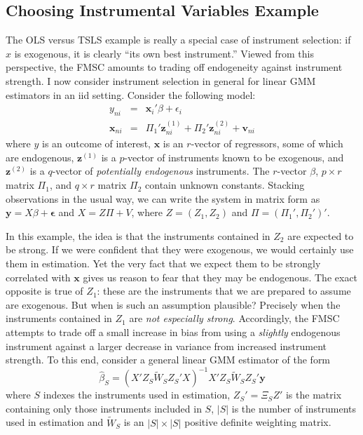 \subsection{Choosing Instrumental Variables Example}
\label{sec:chooseIVexample}
The OLS versus TSLS example is really a special case of instrument selection: if $x$ is exogenous, it is clearly ``its own best instrument.'' 
Viewed from this perspective, the FMSC amounts to trading off endogeneity against instrument strength. I now consider instrument selection in general for linear GMM estimators in an iid setting. 
Consider the following model:
\begin{eqnarray}
    y_{ni} &=& \mathbf{x}_i' \beta +  \epsilon_i\\
    \mathbf{x}_{ni} &=&  \Pi_1' \mathbf{z}_{ni}^{(1)} + \Pi_2'\mathbf{z}_{ni}^{(2)} + \mathbf{v}_{ni}
\end{eqnarray}
where $y$ is an outcome of interest, $\mathbf{x}$ is an $r$-vector of regressors, some of which are endogenous, $\mathbf{z}^{(1)}$ is a $p$-vector of instruments known to be exogenous, and $\mathbf{z}^{(2)}$ is a $q$-vector  of \emph{potentially endogenous} instruments. 
The $r$-vector $\beta$, $p\times r$ matrix $\Pi_1$, and $q\times r$ matrix $\Pi_2$ contain unknown constants. Stacking observations in the usual way, we can write the system in matrix form as $\mathbf{y} = X\beta +\boldsymbol{\epsilon}$ and $X =  Z \Pi + V$, where $Z = (Z_1, Z_2)$ and $\Pi = (\Pi_1', \Pi_2')'$. 

In this example, the idea is that the instruments contained in $Z_2$ are expected to be strong.
If we were confident that they were exogenous, we would certainly use them in estimation. 
Yet the very fact that we expect them to be strongly correlated with $\mathbf{x}$ gives us reason to fear that they may be endogenous. 
The exact opposite is true of $Z_1$: these are the instruments that we are prepared to assume are exogenous. 
But when is such an assumption plausible? Precisely when the instruments contained in $Z_1$ are \emph{not especially strong}. 
Accordingly, the FMSC attempts to trade off a small increase in bias from using a \emph{slightly} endogenous instrument against a larger decrease in variance from increased instrument strength.
To this end, consider a general linear GMM estimator of the form
$$\widehat{\beta}_S = (X'Z_S \widetilde{W}_S Z_S' X)^{-1}X'Z_S \widetilde{W}_S  Z_S' \mathbf{y}$$
where $S$ indexes the instruments used in estimation, $Z_S'  = \Xi_S Z'$ is the matrix containing only those instruments included in $S$, $|S|$ is the number of instruments used in estimation and $\widetilde{W}_S$ is an $|S|\times|S|$ positive definite weighting matrix. 



